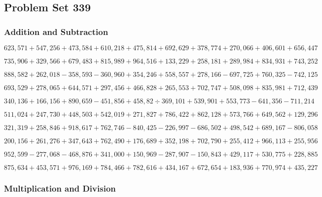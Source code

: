 \hypertarget{problem-set-339}{%
\subsection{Problem Set 339}\label{problem-set-339}}

\hypertarget{addition-and-subtraction}{%
\subsubsection{Addition and
Subtraction}\label{addition-and-subtraction}}

\(623,571+547,256+473,584+610,218+475,814+692,629+378,774+270,066+406,601+656,447\)

\(735,906+329,566+679,483+815,989+964,516+133,229+258,181+289,984+834,931+743,252\)

\(888,582+262,018-358,593-360,960+354,246+558,557+278,166-697,725+760,325-742,125\)

\(693,529+278,065+644,571+297,456+466,828+265,553+702,747+508,098+835,981+712,439\)

\(340,136+166,156+890,659-451,856+458,82÷369,101+539,901+553,773-641,356-711,214\)

\(511,024+247,730+448,503+542,019+271,827+786,422+862,128+573,766+649,562+129,296\)

\(321,319+258,846+918,617+762,746-840,425-226,997-686,502+498,542+689,167-806,058\)

\(200,156+261,276+347,643+762,490+176,689+352,198+702,790+255,412+966,113+255,956\)

\(952,599-277,068-468,876+341,000+150,969-287,907-150,843+429,117+530,775+228,885\)

\(875,634+453,571+976,169+784,466+782,616+434,167+672,654+183,936+770,974+435,227\)

\hypertarget{multiplication-and-division}{%
\subsubsection{Multiplication and
Division}\label{multiplication-and-division}}

